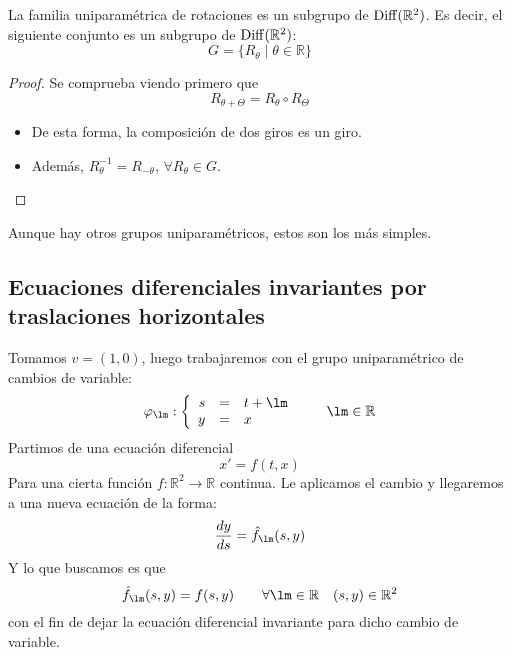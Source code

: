 \begin{prop}
La familia uniparamétrica de rotaciones es un subgrupo de $\operatorname{Diff}(\mathbb{R}^2)$. Es decir, el siguiente conjunto es un subgrupo de $\operatorname{Diff}(\mathbb{R}^2)$:
\begin{equation*}
    G = \{R_\theta \mid \theta \in \mathbb{R}\}
\end{equation*}
\begin{proof}
    Se comprueba viendo primero que    
    \begin{equation*}
        R_{\theta + \Theta} = R_\theta \circ R_\Theta        
    \end{equation*}
    \begin{itemize}
        \item De esta forma, la composición de dos giros es un giro.
        \item Además, $R_\theta^{-1} = R_{-\theta}$, $\forall R_\theta \in G$.
    \end{itemize}
\end{proof}
\end{prop}

Aunque hay otros grupos uniparamétricos, estos son los más simples.

\subsection{Ecuaciones diferenciales invariantes por traslaciones horizontales}
\noindent
Tomamos $v = (1,0)$, luego trabajaremos con el grupo uniparamétrico de cambios de variable:
\begin{equation*}
    \varphi_\lm: \left\{\begin{array}{rcl}
            s &= &t + \lm \\
            y &= &x
    \end{array}\right. \qquad \lm \in \mathbb{R}
\end{equation*}
Partimos de una ecuación diferencial
\begin{equation*}
    x' = f(t,x)
\end{equation*}
Para una cierta función $f:\mathbb{R}^2 \rightarrow \mathbb{R}$ continua. Le aplicamos el cambio y llegaremos a una nueva ecuación de la forma:
\begin{equation*}
    \dfrac{dy}{ds} = \hat{f}_\lm(s,y)
\end{equation*}
Y lo que buscamos es que 
\begin{equation*}
     \hat{f}_\lm(s,y) = f(s,y) \qquad \forall \lm \in \mathbb{R} \quad (s,y)\in \mathbb{R}^2
\end{equation*}
con el fin de dejar la ecuación diferencial invariante para dicho cambio de variable.\\

